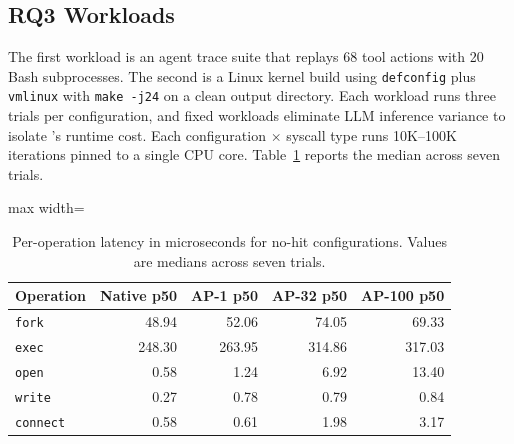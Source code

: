 \subsection{RQ3 Workloads}
\label{sec:supp:setup:rq3}
The first workload is an agent trace suite that replays 68 tool actions with 20 Bash subprocesses. The second is a Linux kernel build using \texttt{defconfig} plus \texttt{vmlinux} with \texttt{make -j24} on a clean output directory.
Each workload runs three trials per configuration, and fixed workloads eliminate LLM inference variance to isolate \sys{}'s runtime cost.
Each configuration $\times$ syscall type runs 10K--100K iterations pinned to a single CPU core.
Table~\ref{tab:micro-latency} reports the median across seven trials.

\begin{table}[tb]\small
\centering
\caption{Per-operation latency in microseconds for no-hit configurations. Values are medians across seven trials.}
\label{tab:micro-latency}
\begin{adjustbox}{max width=\columnwidth}
\begin{tabular}{lrrrr}
\toprule
Operation & Native p50 & AP-1 p50 & AP-32 p50 & AP-100 p50 \\
\midrule
\texttt{fork}    & 48.94 & 52.06 & 74.05 & 69.33 \\
\texttt{exec}    & 248.30 & 263.95 & 314.86 & 317.03 \\
\texttt{open}    & 0.58 & 1.24 & 6.92 & 13.40 \\
\texttt{write}   & 0.27 & 0.78 & 0.79 & 0.84 \\
\texttt{connect} & 0.58 & 0.61 & 1.98 & 3.17 \\
\bottomrule
\end{tabular}
\end{adjustbox}
\end{table}

